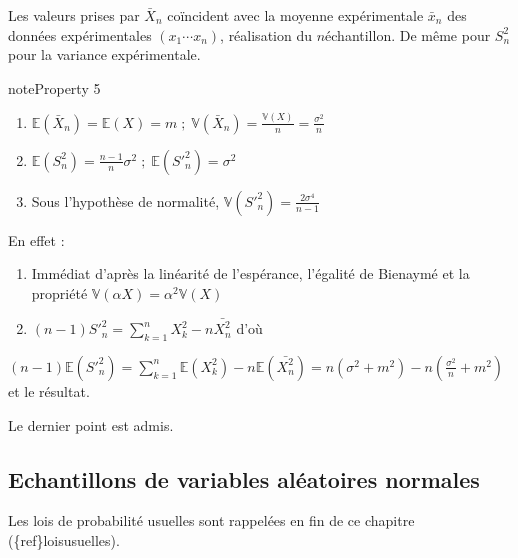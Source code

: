 \documentclass[letterpaper,10pt,french]{sphinxmanual}
\begin{document}
\sphinxAtStartPar
Les valeurs prises par \(\bar{X}_n\) coïncident avec la moyenne expérimentale \(\bar{x}_n\) des données expérimentales \((x_1\cdots x_n)\), réalisation du \(n\)\sphinxhyphen{}échantillon. De même pour \(S_n^2\) pour la variance expérimentale.
\label{elemstats:property-2}
\begin{sphinxadmonition}{note}{Property 5}


\begin{enumerate}
%
\item {} 
\sphinxAtStartPar
\(\mathbb{E}(\bar{X}_n)= \mathbb{E}(X)=m\; ;\; \mathbb{V}(\bar{X}_n) = \frac{\mathbb{V}(X)}{n}=\frac{\sigma^2}{n}\)

\item {} 
\sphinxAtStartPar
\(\mathbb{E}(S_n^2) = \frac{n-1}{n}\sigma^2\; ;\;  \mathbb{E}({S'}_n^2)=\sigma^2\)

\item {} 
\sphinxAtStartPar
Sous l’hypothèse de normalité, \(\mathbb{V}({S'}_n^2)=\frac{2\sigma^4}{n-1}\)

\end{enumerate}
\end{sphinxadmonition}

\sphinxAtStartPar
En effet :
\begin{enumerate}
%
\item {} 
\sphinxAtStartPar
Immédiat d’après la linéarité de l’espérance, l’égalité de Bienaymé et la propriété \(\mathbb{V}(\alpha X)=\alpha^2\mathbb{V}(X)\)

\item {} 
\sphinxAtStartPar
\((n-1){S'}_n^2=\displaystyle\sum_{k=1}^n X_k^2-n\bar{X_n^2}\) d’où

\end{enumerate}

\sphinxAtStartPar
\((n-1)\mathbb{E}({S'}_n^2)=\displaystyle\sum_{k=1}^n\mathbb{E}(X_k^2)-n\mathbb{E}(\bar{X_n^2})=n(\sigma^2+m^2)-n\left (\frac{\sigma^2}{n}+m^2 \right )\)
et le résultat.

\sphinxAtStartPar
Le dernier point est admis.


\subsection{Echantillons de variables aléatoires normales}
\label{\detokenize{elemstats:echantillons-de-variables-aleatoires-normales}}
\sphinxAtStartPar
Les lois de probabilité usuelles sont rappelées en fin de ce chapitre (\{ref\}\textasciigrave{}loisusuelles).
\end{document}
